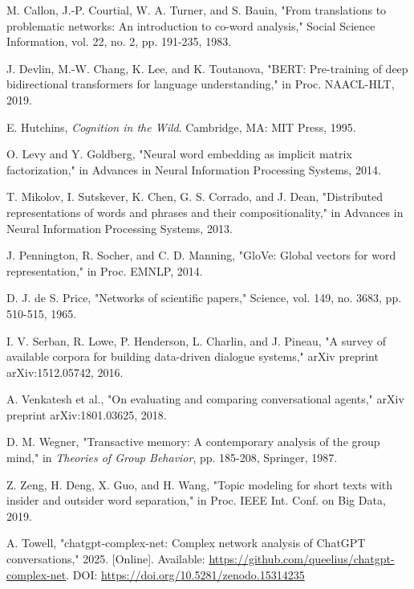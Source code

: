 \documentclass{svproc}
\begin{document}

\begin{thebibliography}{00}

 M. Callon, J.-P. Courtial, W. A. Turner, and S. Bauin, "From translations to problematic networks: An introduction to co-word analysis," Social Science Information, vol. 22, no. 2, pp. 191-235, 1983.

 J. Devlin, M.-W. Chang, K. Lee, and K. Toutanova, "BERT: Pre-training of deep bidirectional transformers for language understanding," in Proc. NAACL-HLT, 2019.

 E. Hutchins, \emph{Cognition in the Wild}. Cambridge, MA: MIT Press, 1995.

 O. Levy and Y. Goldberg, "Neural word embedding as implicit matrix factorization," in Advances in Neural Information Processing Systems, 2014.

 T. Mikolov, I. Sutskever, K. Chen, G. S. Corrado, and J. Dean, "Distributed representations of words and phrases and their compositionality," in Advances in Neural Information Processing Systems, 2013.

 J. Pennington, R. Socher, and C. D. Manning, "GloVe: Global vectors for word representation," in Proc. EMNLP, 2014.

 D. J. de S. Price, "Networks of scientific papers," Science, vol. 149, no. 3683, pp. 510-515, 1965.

 I. V. Serban, R. Lowe, P. Henderson, L. Charlin, and J. Pineau, "A survey of available corpora for building data-driven dialogue systems," arXiv preprint arXiv:1512.05742, 2016.

 A. Venkatesh et al., "On evaluating and comparing conversational agents," arXiv preprint arXiv:1801.03625, 2018.

 D. M. Wegner, "Transactive memory: A contemporary analysis of the group mind," in \emph{Theories of Group Behavior}, pp. 185-208, Springer, 1987.

 Z. Zeng, H. Deng, X. Guo, and H. Wang, "Topic modeling for short texts with insider and outsider word separation," in Proc. IEEE Int. Conf. on Big Data, 2019.

 A. Towell, "chatgpt-complex-net: Complex network analysis of ChatGPT conversations," 2025. [Online]. Available: \url{https://github.com/queelius/chatgpt-complex-net}. DOI: \url{https://doi.org/10.5281/zenodo.15314235}


\end{thebibliography}
\end{document}
